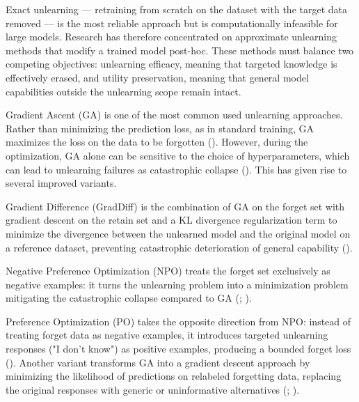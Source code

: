 \documentclass[mscthesis]{usiinfthesis}
\begin{document}
\par\vspace{1em}
Exact unlearning — retraining from scratch on the dataset with the target data removed — is the most reliable approach but is computationally infeasible for large models. Research has therefore concentrated on approximate unlearning methods that modify a trained model post-hoc. These methods must balance two competing objectives: unlearning efficacy, meaning that targeted knowledge is effectively erased, and utility preservation, meaning that general model capabilities outside the unlearning scope remain intact.
\par\vspace{1em}
Gradient Ascent (GA) is one of the most common used unlearning approaches. Rather than minimizing the prediction loss, as in standard training, GA maximizes the loss on the data to be forgotten (\citet{yao2024largelanguagemodelunlearning}). However, during the optimization, GA alone can be sensitive to the choice of hyperparameters, which can lead to unlearning failures as catastrophic collapse  (\citet{liu2024rethinkingmachineunlearninglarge}). This has given rise to several improved variants.
\par\vspace{1em}
Gradient Difference (GradDiff) is the combination of GA on the forget set with gradient descent on the retain set and a KL divergence regularization term to minimize the divergence between the unlearned model and the original model on a reference dataset, preventing catastrophic deterioration of general capability (\citet{hong2024dissectingfinetuningunlearninglarge}).
\par\vspace{1em}
Negative Preference Optimization (NPO) treats the forget set exclusively as negative examples: it turns the unlearning problem into a minimization problem mitigating the catastrophic collapse compared to GA (\citet{liu2024rethinkingmachineunlearninglarge}; \citet{jia2025waglestrategicweightattribution}).
\par\vspace{1em}
Preference Optimization (PO)  takes the opposite direction from NPO: instead of treating forget data as negative examples, it introduces targeted unlearning responses ("I don't know") as positive examples, producing a bounded forget loss (\citet{jia2025waglestrategicweightattribution}).
Another variant transforms GA into a gradient descent approach by minimizing the likelihood of predictions on relabeled forgetting data, replacing the original responses with generic or uninformative alternatives (\citet{yao2024largelanguagemodelunlearning}; \citet{liu2024rethinkingmachineunlearninglarge}).
\end{document}
